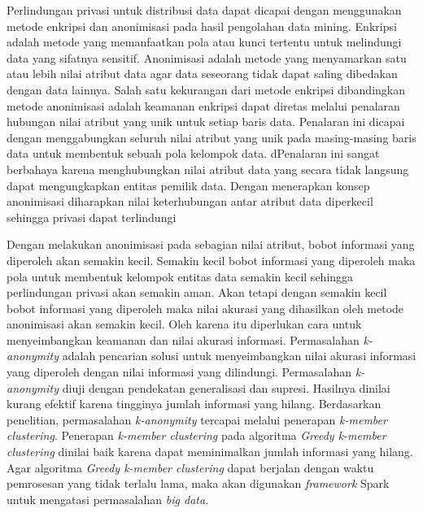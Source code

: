 Perlindungan privasi untuk distribusi data dapat dicapai dengan menggunakan metode enkripsi dan anonimisasi pada hasil pengolahan data mining. Enkripsi adalah metode yang memanfaatkan pola atau kunci tertentu untuk melindungi data yang sifatnya sensitif. Anonimisasi adalah metode yang menyamarkan satu atau lebih nilai atribut data agar data seseorang tidak dapat saling dibedakan dengan data lainnya. Salah satu kekurangan dari metode enkripsi dibandingkan metode anonimisasi adalah keamanan enkripsi dapat diretas melalui penalaran hubungan nilai atribut yang unik untuk setiap baris data. Penalaran ini dicapai dengan menggabungkan seluruh nilai atribut yang unik pada masing-masing baris data untuk membentuk sebuah pola kelompok data. dPenalaran ini sangat berbahaya karena menghubungkan nilai atribut data yang secara tidak langsung dapat mengungkapkan entitas pemilik data. Dengan menerapkan konsep  anonimisasi diharapkan nilai keterhubungan antar atribut data diperkecil sehingga privasi dapat terlindungi

Dengan melakukan anonimisasi pada sebagian nilai atribut, bobot informasi yang diperoleh akan semakin kecil. Semakin kecil bobot informasi yang diperoleh maka pola untuk membentuk kelompok entitas data semakin kecil sehingga perlindungan privasi akan semakin aman. Akan tetapi dengan semakin kecil bobot informasi yang diperoleh maka nilai akurasi yang dihasilkan oleh metode anonimisasi akan semakin kecil. Oleh karena itu diperlukan cara untuk menyeimbangkan keamanan dan nilai akurasi informasi. Permasalahan {\it k-anonymity} adalah pencarian solusi untuk menyeimbangkan nilai akurasi informasi yang diperoleh dengan nilai informasi yang dilindungi. Permasalahan {\it k-anonymity} diuji dengan pendekatan generalisasi dan supresi. Hasilnya dinilai kurang efektif karena tingginya jumlah informasi yang hilang. Berdasarkan penelitian, permasalahan {\it k-anonymity} tercapai melalui penerapan {\it k-member clustering}. Penerapan {\it k-member clustering} pada algoritma {\it Greedy k-member clustering} dinilai baik karena dapat meminimalkan jumlah informasi yang hilang. Agar algoritma \textit{Greedy k-member clustering} dapat berjalan dengan waktu pemrosesan yang tidak terlalu lama, maka akan digunakan \textit{framework} Spark untuk mengatasi permasalahan \textit{big data}.

